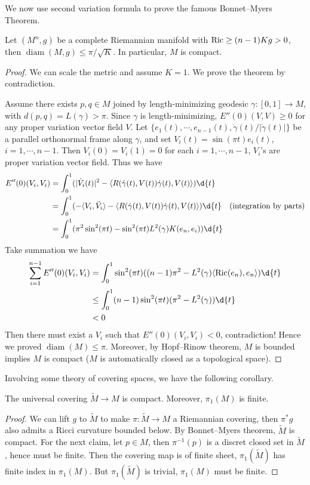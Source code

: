 We now use second variation formula to prove the famous Bonnet--Myers Theorem.
\begin{thm}
    Let $(M^n,g)$ be a complete Riemannian manifold with $\operatorname{Ric}\geq(n-1)Kg>0$,
    then $\operatorname{diam}(M,g)\leq\pi/\sqrt{K}$.
    In particular, $M$ is compact.
\end{thm}
\begin{proof}
    We can scale the metric and assume $K=1$.
    We prove the theorem by contradiction.

    Assume there exists $p,q\in M$ joined by length-minimizing geodesic $\gamma:[0,1]\to M$, with $d(p,q)=L(\gamma)>\pi$.
    Since $\gamma$ is length-minimizing, $E''(0)(V,V)\geq 0$ for any proper variation vector field $V$.
    Let $\{e_1(t),\cdots,e_{n-1}(t),\dot{\gamma}(t)/|\dot{\gamma}(t)|\}$ be a parallel orthonormal frame along $\gamma$, and set $V_i(t)=\sin(\pi t)e_i(t)$, $i=1,\cdots,n-1$.
    Then $V_i(0)=V_i(1)=0$ for each $i=1,\cdots,n-1$, $V_i$'s are proper variation vector field.
    Thus we have
    \begin{align*}
        E''(0)(V_i,V_i)&=\int_0^1(|\dot{V}_i(t)|^2-\langle R(\dot{\gamma}(t),V(t))\dot{\gamma}(t),V(t)\rangle)\d{t}\\
        &=\int_0^1(-\langle V_i,\ddot{V}_i\rangle-\langle R(\dot{\gamma}(t),V(t))\dot{\gamma}(t),V(t)\rangle)\d{t}\quad\text{(integration by parts)}\\
        &=\int_0^1(\pi^2\sin^2(\pi t)-\sin^2(\pi t)L^2(\gamma)K(e_n,e_i))\d{t}
    \end{align*}
    Take summation we have
    \begin{align*}
        \sum_{i=1}^{n-1}E''(0)(V_i,V_i)&=\int_0^1\sin^2(\pi t)((n-1)\pi^2-L^2(\gamma)\langle\Ric(e_n),e_n\rangle)\d{t}\\
        &\leq\int_0^1(n-1)\sin^2(\pi t)(\pi^2-L^2(\gamma))\d{t}\\
        &<0
    \end{align*}
    Then there must exist a $V_i$ such that $E''(0)(V_i,V_i)<0$, contradiction!
    Hence we proved $\operatorname{diam}(M)\leq\pi$.
    Moreover, by Hopf--Rinow theorem, $M$ is bounded implies $M$ is compact ($M$ is automatically closed as a topological space).
\end{proof}

Involving some theory of covering spaces, we have the following corollary.
\begin{cor}
    The universal covering $\tilde{M}\to M$ is compact.
    Moreover, $\pi_1(M)$ is finite.
\end{cor}
\begin{proof}
    We can lift $g$ to $\tilde{M}$ to make $\pi:\tilde{M}\to M$ a Riemannian covering, then $\pi^*g$ also admits a Ricci curvature bounded below.
    By Bonnet--Myers theorem, $\tilde{M}$ is compact.
    For the next claim, let $p\in M$, then $\pi^{-1}(p)$ is a discret closed set in $\tilde{M}$, hence must be finite.
    Then the covering map is of finite sheet, $\pi_1(\tilde{M})$ has finite index in $\pi_1(M)$.
    But $\pi_1(\tilde{M})$ is trivial, $\pi_1(M)$ must be finite.
\end{proof}

